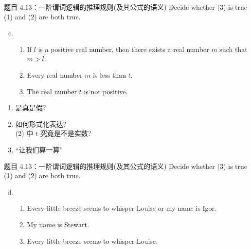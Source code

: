\begin{frame}{}
  \begin{exampleblock}{题目 4.13：一阶谓词逻辑的推理规则(及其公式的语义)}
    Decide whether (3) is true  (1) and (2) are both true.

    \begin{enumerate}[(a)]
      \setcounter{enumi}{2}
      \item 
	\begin{enumerate}[(1)]
	  \item If $l$ is a positive real number, then there exists a real number $m$ such that $m > l$.
	  \item Every real number $m$ is less than $t$.
	  \item The real number $t$ is not positive.
	\end{enumerate}
    \end{enumerate}
  \end{exampleblock}

  \vspace{0.30cm}
  \begin{enumerate}
    \item 是真是假?
      \pause
    \item 如何形式化表达?\\
      \pause
      (2) 中 $t$ 究竟是不是实数?
      \pause
    \item ``让我们算一算''
  \end{enumerate}
\end{frame}

\begin{frame}{}
  \begin{exampleblock}{题目 4.13：一阶谓词逻辑的推理规则(及其公式的语义)}
    Decide whether (3) is true  (1) and (2) are both true.

    \begin{enumerate}[(a)]
      \setcounter{enumi}{3}
      \item 
	\begin{enumerate}[(1)]
	  \item Every little breeze seems to whisper Louise or my name is Igor.
	  \item My name is Stewart.
	  \item Every little breeze seems to whisper Louise.
	\end{enumerate}
    \end{enumerate}
  \end{exampleblock}
\end{frame}

